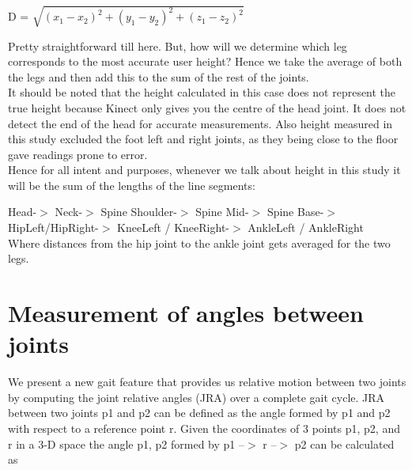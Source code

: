  D = $\sqrt{(x_{1}-x_{2})^2+ (y_{1}-y_{2})^2+(z_{1}-z_{2})^2}$

\noindent Pretty straightforward till here. But, how will we determine which leg corresponds to the most accurate user height? Hence we take the average of both the legs and then add this to the sum of the rest of the joints.\\
It should be noted that the height calculated in this case does not represent the true height because Kinect only gives you the centre of the head joint. It does not detect the end of the head for accurate measurements. Also height measured in this study excluded the foot left and right joints, as they being close to the floor gave readings prone to error.\\
Hence for all intent and purposes, whenever we talk about height in this study it will be the sum of the lengths of the line segments:

\noindent Head-$>$ Neck-$>$ Spine Shoulder-$>$ Spine Mid-$>$ Spine Base-$>$ HipLeft/HipRight-$>$ KneeLeft / KneeRight-$>$ AnkleLeft / AnkleRight\\ 
Where distances from the hip joint to the ankle joint gets averaged for the two legs.

\section{ Measurement of angles between joints} \label{ Measurement of angles between joints}
We present a new gait feature that provides us relative motion between two joints by computing the joint relative angles (JRA) over a complete gait cycle. JRA between two joints p1 and p2 can be defined as the angle formed by p1 and p2 with respect to a reference point r. Given the coordinates of 3 points p1, p2, and r in a 3-D space the angle p1, p2 formed by p1 --$>$ r --$>$ p2 can be calculated as

